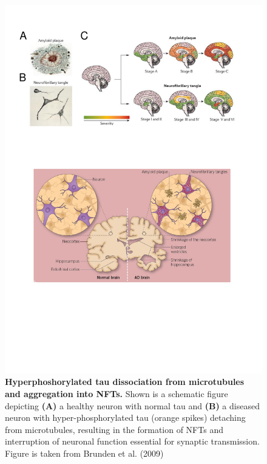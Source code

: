 \begin{figure}[!ht]
	\centering
	\includegraphics[page=13,trim={0 14cm 0cm 0cm},clip, scale = 0.7]{Figures/Introduction_Figures.pdf}
	\captionsetup{width=0.95\textwidth,singlelinecheck=off}
	\caption[Tau tangle hypothesis]%
	{\textbf{Hyperphoshorylated tau dissociation from microtubules and aggregation into NFTs.} Shown is a schematic figure depicting \textbf{(A)} a healthy neuron with normal tau and \textbf{(B)} a diseased neuron with hyper-phosphorylated tau (orange spikes) detaching from microtubules, resulting in the formation of NFTs and interruption of neuronal function essential for synaptic transmission. Figure is taken from Brunden et al. (2009)\cite{Brunden2009}
	}
	\label{fig:tau_hypothesis}
\end{figure}	


